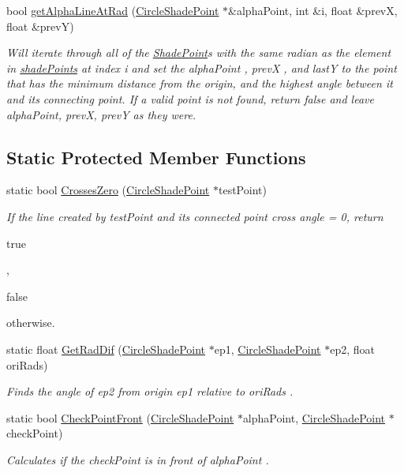 \begin{DoxyCompactItemize}
bool \hyperlink{classlighting_1_1CircleLightSource_a5ceaeef808c64338ffc91b725f53faf1}{get\+Alpha\+Line\+At\+Rad} (\hyperlink{classlighting_1_1CircleShadePoint}{Circle\+Shade\+Point} $\ast$\&alpha\+Point, int \&i, float \&prevX, float \&prevY)
\begin{DoxyCompactList}\small\item\em Will iterate through all of the \hyperlink{classlighting_1_1ShadePoint}{Shade\+Point}s with the same radian as the element in \hyperlink{classlighting_1_1CircleLightSource_acdfea64be9d142f669338c5e206e753e}{shade\+Points} at index {\itshape i}  and set the {\itshape alpha\+Point} , {\itshape prevX} , and lastY to the point that has the minimum distance from the origin, and the highest angle between it and its connecting point. If a valid point is not found, return false and leave alpha\+Point, prevX, prevY as they were. \end{DoxyCompactList}\end{DoxyCompactItemize}
\subsection*{Static Protected Member Functions}
\begin{DoxyCompactItemize}
\item 
static bool \hyperlink{classlighting_1_1CircleLightSource_a93208152ff678f3aa3b985db81a5d450}{Crosses\+Zero} (\hyperlink{classlighting_1_1CircleShadePoint}{Circle\+Shade\+Point} $\ast$test\+Point)
\begin{DoxyCompactList}\small\item\em If the line created by {\itshape test\+Point}  and its connected point cross angle = 0, return 
\begin{DoxyCode}
\textcolor{keyword}{true}
\end{DoxyCode}
, 
\begin{DoxyCode}
\textcolor{keyword}{false}
\end{DoxyCode}
 otherwise. \end{DoxyCompactList}\item 
static float \hyperlink{classlighting_1_1CircleLightSource_a8d273bde1c1330b8a38f7f6ad99914a5}{Get\+Rad\+Dif} (\hyperlink{classlighting_1_1CircleShadePoint}{Circle\+Shade\+Point} $\ast$ep1, \hyperlink{classlighting_1_1CircleShadePoint}{Circle\+Shade\+Point} $\ast$ep2, float ori\+Rads)
\begin{DoxyCompactList}\small\item\em Finds the angle of {\itshape ep2}  from origin {\itshape ep1}  relative to {\itshape ori\+Rads} . \end{DoxyCompactList}\item 
static bool \hyperlink{classlighting_1_1CircleLightSource_a2e8494e55de7dfcff7b4a5f1c60ad0d1}{Check\+Point\+Front} (\hyperlink{classlighting_1_1CircleShadePoint}{Circle\+Shade\+Point} $\ast$alpha\+Point, \hyperlink{classlighting_1_1CircleShadePoint}{Circle\+Shade\+Point} $\ast$check\+Point)
\begin{DoxyCompactList}\small\item\em Calculates if the {\itshape check\+Point}  is in front of {\itshape alpha\+Point} . \end{DoxyCompactList}\end{DoxyCompactItemize}
